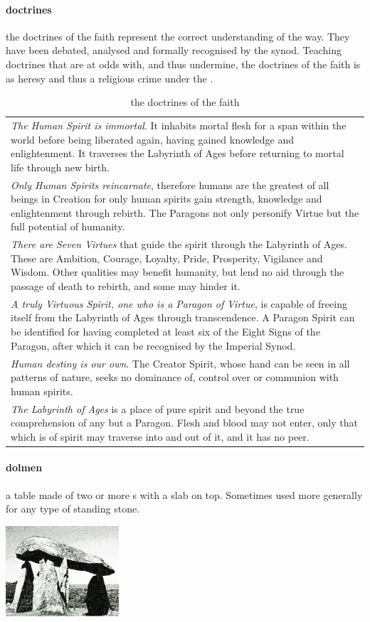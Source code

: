 \paragraph{doctrines} the doctrines of the faith represent the correct understanding of the way. They have been debated, analysed and formally recognised by the synod. Teaching doctrines that are at odds with, and thus undermine, the doctrines of the faith is as heresy and thus a religious crime under the .\begin{table} \begin{tabular}{p{}}\emph{The Human Spirit is immortal}. It inhabits mortal flesh for a span within the world before being liberated again, having gained knowledge and enlightenment. It traverses the Labyrinth of Ages before returning to mortal life through new birth.\\ \emph{Only Human Spirits reincarnate}, therefore humans are the greatest of all beings in Creation for only human spirits gain strength, knowledge and enlightenment through rebirth. The Paragons not only personify Virtue but the full potential of humanity.\\\emph{There are Seven Virtues} that guide the spirit through the Labyrinth of Ages. These are Ambition, Courage, Loyalty, Pride, Prosperity, Vigilance and Wisdom. Other qualities may benefit humanity, but lend no aid through the passage of death to rebirth, and some may hinder it.\\\emph{A truly Virtuous Spirit, one who is a Paragon of Virtue}, is capable of freeing itself from the Labyrinth of Ages through transcendence. A Paragon Spirit can be identified for having completed at least six of the Eight Signs of the Paragon, after which it can be recognised by the Imperial Synod.\\\emph{Human destiny is our own}. The Creator Spirit, whose hand can be seen in all patterns of nature, seeks no dominance of, control over or communion with human spirits.\\\emph{The Labyrinth of Ages} is a place of pure spirit and beyond the true comprehension of any but a Paragon. Flesh and blood may not enter, only that which is of spirit may traverse into and out of it, and it has no peer.\end{tabular}\caption{the doctrines of the faith}\end{table}
\paragraph{dolmen} a table made of two or more s with a slab on top. Sometimes used more generally for any type of standing stone. 
\begin{center}\includegraphics[width=4.2cm]{encyclopedia/Dolmen2}\end{center}

